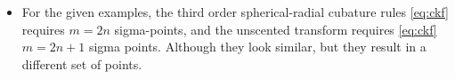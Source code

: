 \documentclass[12pt]{article}
\begin{document}
\begin{enumerate}[label=\arabic*)]
\begin{itemize}
                \begin{subequations} \label{eq:ukf}
                \begin{align}
                \xi^{(0)} &= \hat{x}_{k|k}, \qquad \qquad \qquad \qquad \qquad \qquad \omega^{(0)} = \bar \omega, \\
                \xi^{(i)} &= \hat{x}_{k|k} + \sqrt{\frac{n}{1-\omega^{(0)}} P_{x|x}}, \qquad \qquad \;  \omega^{(i)} = \frac{1-\omega^{(0)}}{2n}, \\
                \xi^{(i+n)} &= \hat{x}_{k|k} - \sqrt{\frac{n}{1-\omega^{(0)}} P_{x|x}}, \qquad \quad \, \omega^{(i+n)} = \frac{1-\omega^{(0)}}{2n}. 
                \end{align} 
                \end{subequations}
                
            \item 
                For the given examples, the third order spherical-radial cubature rules \eqref{eq:ckf} requires $m=2n$ sigma-points, and the unscented transform requires \eqref{eq:ckf}  $m=2n+1$ sigma points. Although they look similar, but they result in a different set of points.
        \end{itemize}
\end{enumerate}
\end{document}
